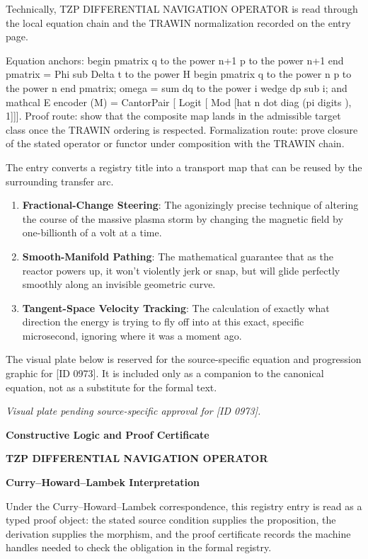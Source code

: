 Technically, TZP DIFFERENTIAL NAVIGATION OPERATOR is read through the local equation chain and the TRAWIN normalization recorded on the entry page.

Equation anchors: begin pmatrix q to the power n+1 p to the power n+1 end pmatrix = Phi sub Delta t to the power H begin pmatrix q to the power n p to the power n end pmatrix; omega = sum dq to the power i wedge dp sub i; and mathcal E encoder (M) = CantorPair [ Logit [ Mod [hat n dot diag (pi digits ), 1]]]. Proof route: show that the composite map lands in the admissible target class once the TRAWIN ordering is respected. Formalization route: prove closure of the stated operator or functor under composition with the TRAWIN chain.

The entry converts a registry title into a transport map that can be reused by the surrounding transfer arc.
\endgroup

\begin{enumerate}[leftmargin=1.6em,itemsep=6pt,topsep=4pt]
\item \textbf{Fractional-Change Steering}: The agonizingly precise technique of altering the course of the massive plasma storm by changing the magnetic field by one-billionth of a volt at a time.
\item \textbf{Smooth-Manifold Pathing}: The mathematical guarantee that as the reactor powers up, it won't violently jerk or snap, but will glide perfectly smoothly along an invisible geometric curve.
\item \textbf{Tangent-Space Velocity Tracking}: The calculation of exactly what direction the energy is trying to fly off into at this exact, specific microsecond, ignoring where it was a moment ago.
\end{enumerate}

\begingroup\footnotesize\sloppy
The visual plate below is reserved for the source-specific equation and progression graphic for [ID 0973]. It is included only as a companion to the canonical equation, not as a substitute for the formal text.
\par\endgroup
\begingroup\footnotesize\itshape
Visual plate pending source-specific approval for [ID 0973].
\par\endgroup

\clearpage
\begingroup\tzpsupportsetup
\noindent\textbf{\fontsize{10.8pt}{12.8pt}\selectfont [ID 0973] Constructive Logic and Proof Certificate}\par
\noindent\textbf{\fontsize{10pt}{12pt}\selectfont TZP DIFFERENTIAL NAVIGATION OPERATOR}\par
\vspace{0.45em}
\begingroup
\footnotesize
\setlength{\parskip}{0.22em}
\setlength{\parindent}{0pt}
\noindent\textbf{Curry--Howard--Lambek Interpretation}\par
Under the Curry--Howard--Lambek correspondence, this registry entry is read as a typed proof
object: the stated source condition supplies the proposition, the derivation supplies the
morphism, and the proof certificate records the machine handles needed to check the obligation
in the formal registry.

